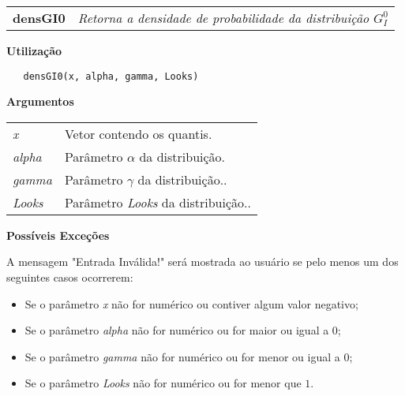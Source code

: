 \newpage

\hrulefill   

\begin{table}[!ht]
\begin{center}
\begin{tabularx}{\textwidth}{ X X}
\hspace{0.5cm} \textbf{densGI0} & \textit{Retorna a densidade de probabilidade da distribuição $G_I^0$}\\
\end{tabularx}
\end{center}
\end{table} 

\vspace{-0.5cm}
\hrulefill  
\vspace{0.5cm}

\textbf{Utilização}

\begin{lstlisting}
   densGI0(x, alpha, gamma, Looks)
\end{lstlisting}

\vspace{0.5cm}

\textbf{Argumentos}

\begin{table}[!ht]
\begin{center}
\begin{tabularx}{\textwidth}{X X}
\hspace{0.5cm} \textit{x} & Vetor contendo os quantis.\\
\hspace{0.5cm} \textit{alpha} & Parâmetro $\alpha$ da distribuição.\\
\hspace{0.5cm} \textit{gamma} & Parâmetro $\gamma$ da distribuição..\\
\hspace{0.5cm} \textit{Looks} & Parâmetro \textit{Looks} da distribuição..\\
\end{tabularx}
\end{center}
\end{table} 

\textbf{Possíveis Exceções}

\vspace{0.5cm}

A mensagem "Entrada Inválida!" será mostrada ao usuário se pelo menos um dos seguintes casos ocorrerem:

\begin{itemize}
    \item Se o parâmetro \textit{x} não for numérico ou contiver algum valor negativo;
    \item Se o parâmetro \textit{alpha} não for numérico ou for maior ou igual a $0$;
    \item Se o parâmetro \textit{gamma} não for numérico ou for menor ou igual a $0$;
    \item Se o parâmetro \textit{Looks} não for numérico ou for menor que $1$.
\end{itemize}

